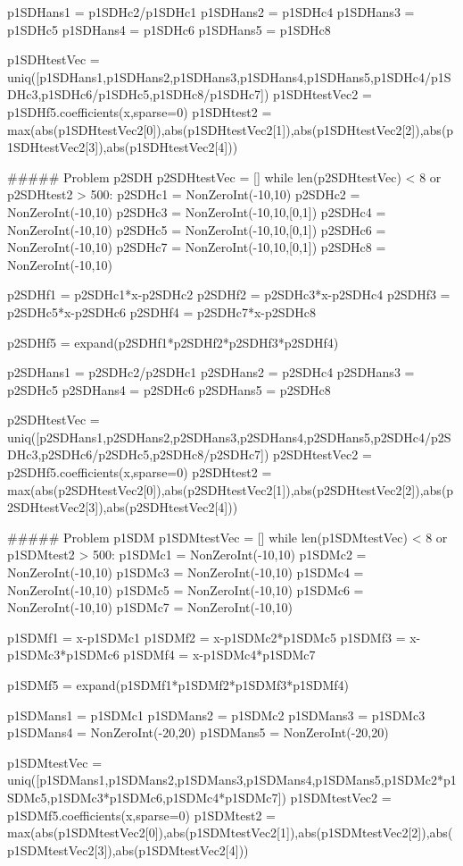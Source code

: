 \documentclass{ximera}
\begin{document}
\begin{sagesilent}
    p1SDHans1 = p1SDHc2/p1SDHc1
    p1SDHans2 = p1SDHc4
    p1SDHans3 = p1SDHc5
    p1SDHans4 = p1SDHc6
    p1SDHans5 = p1SDHc8
    
    p1SDHtestVec = uniq([p1SDHans1,p1SDHans2,p1SDHans3,p1SDHans4,p1SDHans5,p1SDHc4/p1SDHc3,p1SDHc6/p1SDHc5,p1SDHc8/p1SDHc7])
    p1SDHtestVec2 = p1SDHf5.coefficients(x,sparse=0)
    p1SDHtest2 = max(abs(p1SDHtestVec2[0]),abs(p1SDHtestVec2[1]),abs(p1SDHtestVec2[2]),abs(p1SDHtestVec2[3]),abs(p1SDHtestVec2[4]))


##### Problem p2SDH
p2SDHtestVec = []
while len(p2SDHtestVec) < 8 or p2SDHtest2 > 500:
    p2SDHc1 = NonZeroInt(-10,10)
    p2SDHc2 = NonZeroInt(-10,10)
    p2SDHc3 = NonZeroInt(-10,10,[0,1])
    p2SDHc4 = NonZeroInt(-10,10)
    p2SDHc5 = NonZeroInt(-10,10,[0,1])
    p2SDHc6 = NonZeroInt(-10,10)
    p2SDHc7 = NonZeroInt(-10,10,[0,1])
    p2SDHc8 = NonZeroInt(-10,10)
    
    p2SDHf1 = p2SDHc1*x-p2SDHc2
    p2SDHf2 = p2SDHc3*x-p2SDHc4
    p2SDHf3 = p2SDHc5*x-p2SDHc6
    p2SDHf4 = p2SDHc7*x-p2SDHc8
    
    p2SDHf5 = expand(p2SDHf1*p2SDHf2*p2SDHf3*p2SDHf4)
    
    p2SDHans1 = p2SDHc2/p2SDHc1
    p2SDHans2 = p2SDHc4
    p2SDHans3 = p2SDHc5
    p2SDHans4 = p2SDHc6
    p2SDHans5 = p2SDHc8
    
    p2SDHtestVec = uniq([p2SDHans1,p2SDHans2,p2SDHans3,p2SDHans4,p2SDHans5,p2SDHc4/p2SDHc3,p2SDHc6/p2SDHc5,p2SDHc8/p2SDHc7])
    p2SDHtestVec2 = p2SDHf5.coefficients(x,sparse=0)
    p2SDHtest2 = max(abs(p2SDHtestVec2[0]),abs(p2SDHtestVec2[1]),abs(p2SDHtestVec2[2]),abs(p2SDHtestVec2[3]),abs(p2SDHtestVec2[4]))

##### Problem p1SDM
p1SDMtestVec = []
while len(p1SDMtestVec) < 8 or p1SDMtest2 > 500:
    p1SDMc1 = NonZeroInt(-10,10)
    p1SDMc2 = NonZeroInt(-10,10)
    p1SDMc3 = NonZeroInt(-10,10)
    p1SDMc4 = NonZeroInt(-10,10)
    p1SDMc5 = NonZeroInt(-10,10)
    p1SDMc6 = NonZeroInt(-10,10)
    p1SDMc7 = NonZeroInt(-10,10)
    
    p1SDMf1 = x-p1SDMc1
    p1SDMf2 = x-p1SDMc2*p1SDMc5
    p1SDMf3 = x-p1SDMc3*p1SDMc6
    p1SDMf4 = x-p1SDMc4*p1SDMc7
    
    p1SDMf5 = expand(p1SDMf1*p1SDMf2*p1SDMf3*p1SDMf4)
    
    p1SDMans1 = p1SDMc1
    p1SDMans2 = p1SDMc2
    p1SDMans3 = p1SDMc3
    p1SDMans4 = NonZeroInt(-20,20)
    p1SDMans5 = NonZeroInt(-20,20)
    
    p1SDMtestVec = uniq([p1SDMans1,p1SDMans2,p1SDMans3,p1SDMans4,p1SDMans5,p1SDMc2*p1SDMc5,p1SDMc3*p1SDMc6,p1SDMc4*p1SDMc7])
    p1SDMtestVec2 = p1SDMf5.coefficients(x,sparse=0)
    p1SDMtest2 = max(abs(p1SDMtestVec2[0]),abs(p1SDMtestVec2[1]),abs(p1SDMtestVec2[2]),abs(p1SDMtestVec2[3]),abs(p1SDMtestVec2[4]))



\end{sagesilent}
\end{document}
